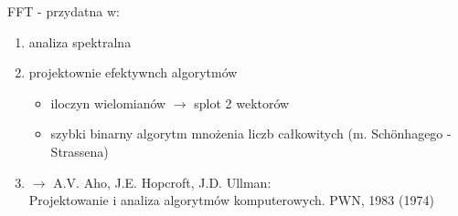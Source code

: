 \begin{frame}{FFT - przydatna w:}
	\begin{enumerate}
		\item analiza spektralna \\
		\item projektownie efektywnch algorytmów
		\begin{itemize}
			\item iloczyn wielomianów $\to$ splot 2 wektorów \\
			\item szybki binarny algorytm mnożenia liczb całkowitych
			(m. Sch\"{o}nhagego - Strassena)
		\end{itemize}
		\item $\to$ A.V. Aho, J.E. Hopcroft, J.D. Ullman: \\
		Projektowanie i analiza algorytmów komputerowych. PWN, 1983 (1974)
	\end{enumerate}
\end{frame}